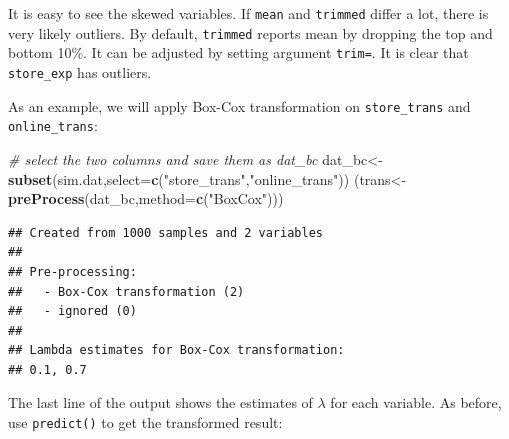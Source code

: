 \documentclass[]{book}
\newenvironment{Shaded}{\begin{snugshade}}{\end{snugshade}}
\newcommand{\KeywordTok}[1]{\textcolor[rgb]{0.13,0.29,0.53}{\textbf{{#1}}}}
\newcommand{\DataTypeTok}[1]{\textcolor[rgb]{0.13,0.29,0.53}{{#1}}}
\newcommand{\DecValTok}[1]{\textcolor[rgb]{0.00,0.00,0.81}{{#1}}}
\newcommand{\StringTok}[1]{\textcolor[rgb]{0.31,0.60,0.02}{{#1}}}
\newcommand{\CommentTok}[1]{\textcolor[rgb]{0.56,0.35,0.01}{\textit{{#1}}}}
\newcommand{\NormalTok}[1]{{#1}}
\theoremstyle{definition}
\theoremstyle{definition}
\theoremstyle{remark}
\begin{document}
It is easy to see the skewed variables. If \texttt{mean} and
\texttt{trimmed} differ a lot, there is very likely outliers. By
default, \texttt{trimmed} reports mean by dropping the top and bottom
10\%. It can be adjusted by setting argument \texttt{trim=}. It is clear
that \texttt{store\_exp} has outliers.

As an example, we will apply Box-Cox transformation on
\texttt{store\_trans} and \texttt{online\_trans}:

\begin{Shaded}
\begin{Highlighting}[]
\CommentTok{# select the two columns and save them as dat_bc}
\NormalTok{dat_bc<-}\KeywordTok{subset}\NormalTok{(sim.dat,}\DataTypeTok{select=}\KeywordTok{c}\NormalTok{(}\StringTok{"store_trans"}\NormalTok{,}\StringTok{"online_trans"}\NormalTok{))}
\NormalTok{(trans<-}\KeywordTok{preProcess}\NormalTok{(dat_bc,}\DataTypeTok{method=}\KeywordTok{c}\NormalTok{(}\StringTok{"BoxCox"}\NormalTok{)))}
\end{Highlighting}
\end{Shaded}

\begin{verbatim}
## Created from 1000 samples and 2 variables
## 
## Pre-processing:
##   - Box-Cox transformation (2)
##   - ignored (0)
## 
## Lambda estimates for Box-Cox transformation:
## 0.1, 0.7
\end{verbatim}

The last line of the output shows the estimates of \(\lambda\) for each
variable. As before, use \texttt{predict()} to get the transformed
result:

\begin{Shaded}
\end{Shaded}
\end{document}
